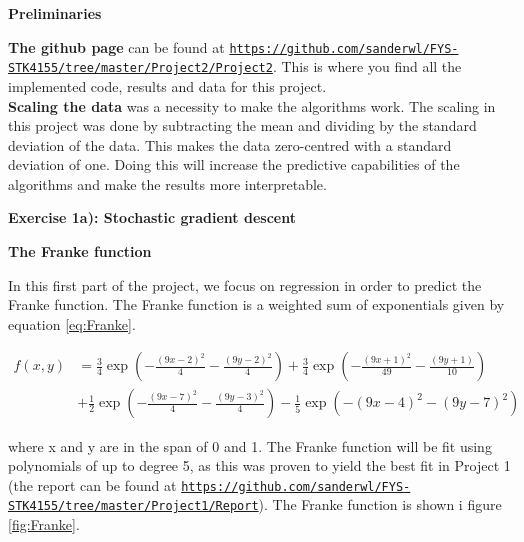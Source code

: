 \documentclass[12pt,a4paper]{article}
\begin{document}
\newpage

\begin{center}
\Large{\textbf{Preliminaries}}
\end{center}

\noindent \textbf{The github page} can be found at \href{{https://github.com/sanderwl/FYS-STK4155/tree/master/Project2/Project2}}{\nolinkurl{https://github.com/sanderwl/FYS-STK4155/tree/master/Project2/Project2}}. This is where you find all the implemented code, results and data for this project.
\\
\textbf{Scaling the data} was a necessity to make the algorithms work. The scaling in this project was done by subtracting the mean and dividing by the standard deviation of the data. This makes the data zero-centred with a standard deviation of one. Doing this will increase the predictive capabilities of the algorithms and make the results more interpretable.

\newpage

\begin{center}
\Large{\textbf{Exercise 1a): Stochastic gradient descent}}
\end{center}

\begin{center}
\large{\textbf{The Franke function}}
\end{center}

\noindent In this first part of the project, we focus on regression in order to predict the Franke function. The Franke function is a weighted sum of exponentials given by equation \ref{eq:Franke}.

\begin{equation}\label{eq:Franke}
\begin{aligned}
f(x,y) &= \frac{3}{4}\exp{\left(-\frac{(9x-2)^2}{4} - \frac{(9y-2)^2}{4}\right)}+\frac{3}{4}\exp{\left(-\frac{(9x+1)^2}{49}- \frac{(9y+1)}{10}\right)} \\
&+\frac{1}{2}\exp{\left(-\frac{(9x-7)^2}{4} - \frac{(9y-3)^2}{4}\right)} -\frac{1}{5}\exp{\left(-(9x-4)^2 - (9y-7)^2\right) }
\end{aligned}
\end{equation}

\noindent where x and y are in the span of 0 and 1. The Franke function will be fit using polynomials of up to degree 5, as this was proven to yield the best fit in Project 1 (the report can be found at \href{{https://github.com/sanderwl/FYS-STK4155/tree/master/Project1/Report}}{\nolinkurl{https://github.com/sanderwl/FYS-STK4155/tree/master/Project1/Report}}). The Franke function is shown i figure \ref{fig:Franke}.
\end{document}
